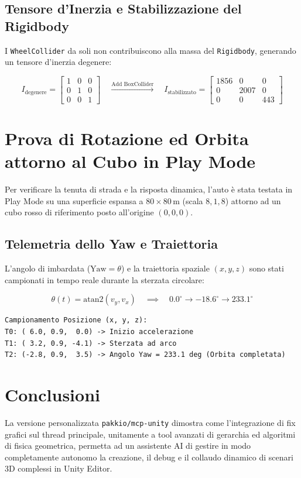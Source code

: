 \documentclass[11pt,a4paper]{article}
\begin{document}
\subsection{Tensore d'Inerzia e Stabilizzazione del Rigidbody}
I \texttt{WheelCollider} da soli non contribuiscono alla massa del \texttt{Rigidbody}, generando un tensore d'inerzia degenere:

\begin{equation}
I_{\text{degenere}} = \begin{bmatrix} 1 & 0 & 0 \\ 0 & 1 & 0 \\ 0 & 0 & 1 \end{bmatrix} \quad \xrightarrow{\text{Add BoxCollider}} \quad I_{\text{stabilizzato}} = \begin{bmatrix} 1856 & 0 & 0 \\ 0 & 2007 & 0 \\ 0 & 0 & 443 \end{bmatrix}
\end{equation}

\section{Prova di Rotazione ed Orbita attorno al Cubo in Play Mode}

Per verificare la tenuta di strada e la risposta dinamica, l'auto è stata testata in Play Mode su una superficie espansa a $80 \times 80\,\text{m}$ (scala $8,1,8$) attorno ad un cubo rosso di riferimento posto all'origine $(0,0,0)$.

\subsection{Telemetria dello Yaw e Traiettoria}
L'angolo di imbardata ($\text{Yaw} = \theta$) e la traiettoria spaziale $(x,y,z)$ sono stati campionati in tempo reale durante la sterzata circolare:

\begin{equation}
\theta(t) = \text{atan2}(v_y, v_x) \quad \implies \quad 0.0^\circ \longrightarrow -18.6^\circ \longrightarrow 233.1^\circ
\end{equation}

\begin{lstlisting}[caption={Dati di Telemetria acquisiti durante l'orbita del Cubo di Riferimento}]
Campionamento Posizione (x, y, z):
T0: ( 6.0, 0.9,  0.0) -> Inizio accelerazione
T1: ( 3.2, 0.9, -4.1) -> Sterzata ad arco
T2: (-2.8, 0.9,  3.5) -> Angolo Yaw = 233.1 deg (Orbita completata)
\end{lstlisting}

\section{Conclusioni}

La versione personalizzata \texttt{pakkio/mcp-unity} dimostra come l'integrazione di fix grafici sul thread principale, unitamente a tool avanzati di gerarchia ed algoritmi di fisica geometrica, permetta ad un assistente AI di gestire in modo completamente autonomo la creazione, il debug e il collaudo dinamico di scenari 3D complessi in Unity Editor.
\end{document}
